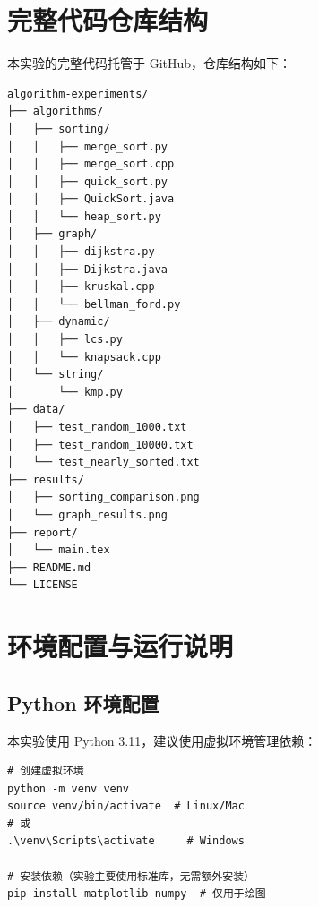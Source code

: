 \documentclass[12pt,a4paper,UTF8]{article}
\begin{document}
\newpage
\begin{appendix}
\titlespacing*{\section}{0pt}{1em}{0.5em}

\section{完整代码仓库结构}

本实验的完整代码托管于 GitHub，仓库结构如下：

\begin{verbatim}
algorithm-experiments/
├── algorithms/
│   ├── sorting/
│   │   ├── merge_sort.py
│   │   ├── merge_sort.cpp
│   │   ├── quick_sort.py
│   │   ├── QuickSort.java
│   │   └── heap_sort.py
│   ├── graph/
│   │   ├── dijkstra.py
│   │   ├── Dijkstra.java
│   │   ├── kruskal.cpp
│   │   └── bellman_ford.py
│   ├── dynamic/
│   │   ├── lcs.py
│   │   └── knapsack.cpp
│   └── string/
│       └── kmp.py
├── data/
│   ├── test_random_1000.txt
│   ├── test_random_10000.txt
│   └── test_nearly_sorted.txt
├── results/
│   ├── sorting_comparison.png
│   └── graph_results.png
├── report/
│   └── main.tex
├── README.md
└── LICENSE
\end{verbatim}

\section{环境配置与运行说明}

\subsection{Python 环境配置}

本实验使用 Python 3.11，建议使用虚拟环境管理依赖：

\begin{lstlisting}[style=bash-style]
# 创建虚拟环境
python -m venv venv
source venv/bin/activate  # Linux/Mac
# 或
.\venv\Scripts\activate     # Windows

# 安装依赖（实验主要使用标准库，无需额外安装）
pip install matplotlib numpy  # 仅用于绘图
\end{lstlisting}


\end{appendix}
\end{document}
